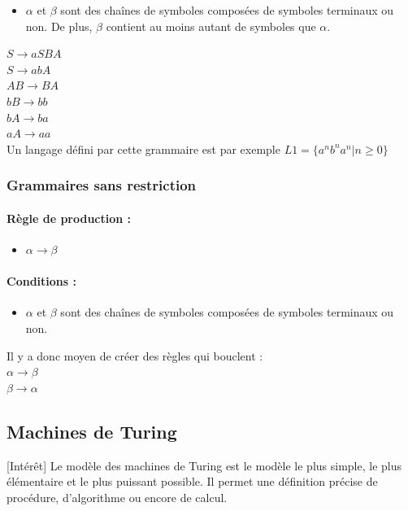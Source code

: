\begin{itemize}
	\item $\alpha$ et $\beta$ sont des chaînes de symboles composées de 
		symboles terminaux ou non. De plus, $\beta$ contient au moins 
		autant de symboles que $\alpha$.
\end{itemize}

\begin{myexem}
	$S \rightarrow aSBA$ \\
	$S \rightarrow abA$ \\
	$AB \rightarrow BA$ \\
	$bB \rightarrow bb$ \\
	$bA \rightarrow ba$ \\
	$aA \rightarrow aa$ \\
	Un langage défini par cette grammaire est par exemple $L1 =
	\{a^nb^na^n|n \geq 0\}$
\end{myexem}


\subsubsection{Grammaires sans restriction}

\paragraph{Règle de production :} 
\begin{itemize}
	\item $\alpha \rightarrow \beta$
\end{itemize}

\paragraph{Conditions :}

\begin{itemize}
	\item $\alpha$ et $\beta$ sont des chaînes de symboles composées de 
		symboles terminaux ou non.
\end{itemize}

\begin{myexem}
	Il y a donc moyen de créer des règles qui bouclent : \\
	$\alpha \rightarrow \beta$ \\
	$\beta \rightarrow \alpha$\\
\end{myexem}

\subsection{Machines de Turing}[Intérêt] Le modèle des machines de Turing est le modèle le plus 
simple, le plus élémentaire et le plus puissant possible. Il permet une 
définition précise de procédure, d'algorithme ou encore de calcul.

